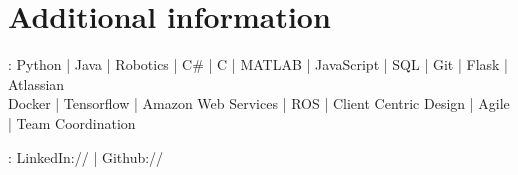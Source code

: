 \documentclass[]{jack-resume}
\begin{document}


\section{Additional information}
: 
Python \hfill | \hfill
Java \hfill | \hfill
Robotics \hfill | \hfill
C\# \hfill | \hfill
C \hfill | \hfill
MATLAB \hfill | \hfill
JavaScript \hfill | \hfill
SQL \hfill | \hfill
Git \hfill | \hfill
Flask \hfill | \hfill
Atlassian \\
\hspace{1.0cm} Docker \hfill | \hfill
Tensorflow \hfill | \hfill
Amazon Web Services \hfill | \hfill
ROS \hfill | \hfill
Client Centric Design \hfill | \hfill
Agile \hfill | \hfill
Team Coordination

: 
LinkedIn://  \href{https://www.linkedin.com/in/jack-sturtevant/}{ \ExternalLink} |
Github:// \href{https://github.com/jacksturtevant}{ \ExternalLink}








\end{document}
